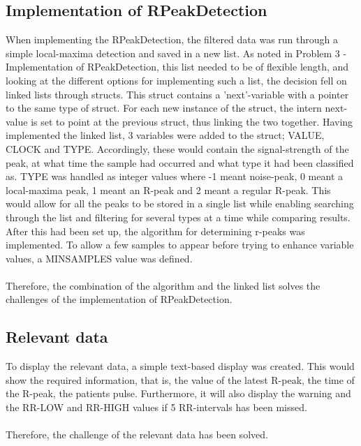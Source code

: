 \documentclass[12pt,a4paper]{article}
\begin{document}
\subsection{Implementation of RPeakDetection}
	When implementing the RPeakDetection, the filtered data was run through a simple local-maxima detection and saved in a new list. As noted in Problem 3 - Implementation of RPeakDetection, this list needed to be of flexible length, and looking at the different options for implementing such a list, the decision fell on linked lists through structs. This struct contains a 'next'-variable with a pointer to the same type of struct. For each new instance of the struct, the intern next-value is set to point at the previous struct, thus linking the two together. 
	Having implemented the linked list, 3 variables were added to the struct; VALUE, CLOCK and TYPE. Accordingly, these would contain the signal-strength of the peak, at what time the sample had occurred and what type it had been classified as. TYPE was handled as integer values where -1 meant noise-peak, 0 meant a local-maxima peak, 1 meant an R-peak and 2 meant a regular R-peak. This would allow for all the peaks to be stored in a single list while enabling searching through the list and filtering for several types at a time while comparing results. 
	After this had been set up, the algorithm for determining r-peaks was implemented. To allow a few samples to appear before trying to enhance variable values, a MINSAMPLES value was defined.\\
	\\
	Therefore, the combination of the algorithm and the linked list solves the challenges of the implementation of RPeakDetection.
	
\subsection{Relevant data}
	To display the relevant data, a simple text-based display was created. This would show the required information, that is, the value of the latest R-peak, the time of the R-peak, the patients pulse. Furthermore, it will also display the warning and the RR-LOW and RR-HIGH values if 5 RR-intervals has been missed.\\
	\\
	Therefore, the challenge of the relevant data has been solved.
\end{document}
